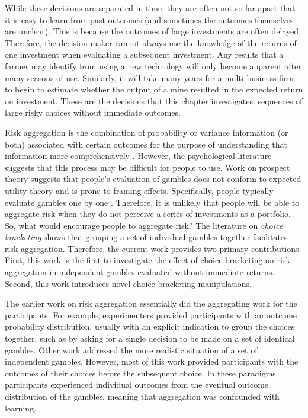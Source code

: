 \documentclass[a4paper, nobind]{templates/ociamthesis}
\theoremstyle{definition}
\theoremstyle{definition}
\theoremstyle{definition}
\theoremstyle{definition}
\theoremstyle{remark}
\begin{document}
While these decisions are separated in time, they are often not so far apart
that it is easy to learn from past outcomes (and sometimes the outcomes
themselves are unclear). This is because the outcomes of large investments are
often delayed. Therefore, the decision-maker cannot always use the knowledge of
the returns of one investment when evaluating a subsequent investment. Any
results that a farmer may identify from using a new technology will only become
apparent after many seasons of use. Similarly, it will take many years for a
multi-business firm to begin to estimate whether the output of a mine resulted
in the expected return on investment. These are the decisions that this chapter
investigates: sequences of large risky choices without immediate outcomes.

Risk aggregation is the combination of probability or variance information (or
both) associated with certain outcomes for the purpose of understanding that
information more comprehensively \autocite{bjornsen2019}. However, the psychological
literature suggests that this process may be difficult for people to use. Work
on prospect theory \autocite{kahneman1979} suggests that people's evaluation of gambles
does not conform to expected utility theory and is prone to framing effects.
Specifically, people typically evaluate gambles one by one \autocite{rabin2009,tversky1981,kahneman1993}. Therefore, it is unlikely that people will be able
to aggregate risk when they do not perceive a series of investments as a
portfolio. So, what would encourage people to aggregate risk? The literature on
\emph{choice bracketing} \autocite{read1999} shows that grouping a set of individual gambles
together facilitates risk aggregation. Therefore, the current work provides two
primary contributions. First, this work is the first to investigate the effect
of choice bracketing on risk aggregation in independent gambles evaluated
without immediate returns. Second, this work introduces novel choice bracketing
manipulations.

The earlier work on risk aggregation essentially did the aggregating work for
the participants. For example, experimenters provided participants with an
outcome probability distribution, usually with an explicit indication to group
the choices together, such as by asking for a single decision to be made on a
set of identical gambles. Other work addressed the more realistic situation of a
set of independent gambles. However, most of this work provided participants
with the outcomes of their choices before the subsequent choice. In these
paradigms participants experienced individual outcomes from the eventual outcome
distribution of the gambles, meaning that aggregation was confounded with
learning.
\end{document}
